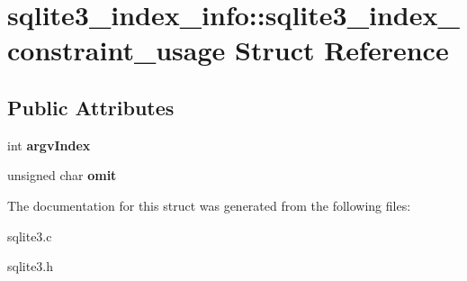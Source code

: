 \hypertarget{structsqlite3__index__info_1_1sqlite3__index__constraint__usage}{}\section{sqlite3\+\_\+index\+\_\+info\+:\+:sqlite3\+\_\+index\+\_\+constraint\+\_\+usage Struct Reference}
\label{structsqlite3__index__info_1_1sqlite3__index__constraint__usage}
\subsection*{Public Attributes}
\begin{DoxyCompactItemize}
\item 
int {\bfseries argv\+Index}\hypertarget{structsqlite3__index__info_1_1sqlite3__index__constraint__usage_a2cbf680033c2937b3de226e091743a94}{}\label{structsqlite3__index__info_1_1sqlite3__index__constraint__usage_a2cbf680033c2937b3de226e091743a94}

\item 
unsigned char {\bfseries omit}\hypertarget{structsqlite3__index__info_1_1sqlite3__index__constraint__usage_ad07fa17d30e4fb3abe23ceaf84edf0ef}{}\label{structsqlite3__index__info_1_1sqlite3__index__constraint__usage_ad07fa17d30e4fb3abe23ceaf84edf0ef}

\end{DoxyCompactItemize}


The documentation for this struct was generated from the following files\+:\begin{DoxyCompactItemize}
\item 
sqlite3.\+c\item 
sqlite3.\+h\end{DoxyCompactItemize}
